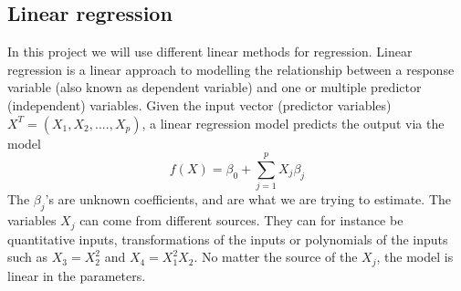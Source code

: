 \documentclass[12pt]{article}
\begin{document}
\subsection{Linear regression}
In this project we will use different linear methods for regression. Linear regression is a linear approach to modelling the relationship between a response variable (also known as dependent variable) and one or multiple predictor (independent) variables. Given the input vector (predictor variables) $X^T = (X_1, X_2,...., X_p)$, a linear regression model predicts the output via the model
\begin{equation} \label{eq:lin_reg}
f(X) = \beta_{0} + \sum_{j=1}^{p}X_j\beta_{j}
\end{equation}
The $\beta_j$'s are unknown coefficients, and are what we are trying to estimate. The variables $X_j$ can come from different sources. They can for instance be quantitative inputs, transformations of the inputs or polynomials of the inputs such as $X_3 = X_2^2$ and $X_4 = X_1^2X_2$. No matter the source of the $X_j$, the model is linear in the parameters.
\end{document}
